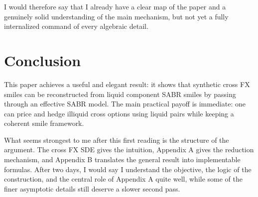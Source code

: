 \documentclass[11pt]{article}
\begin{document}
I would therefore say that I already have a clear map of the paper and a genuinely solid understanding of the main mechanism, but not yet a fully internalized command of every algebraic detail.

\section{Conclusion}

This paper achieves a useful and elegant result: it shows that synthetic cross FX smiles can be reconstructed from liquid component SABR smiles by passing through an effective SABR model. The main practical payoff is immediate: one can price and hedge illiquid cross options using liquid pairs while keeping a coherent smile framework.

What seems strongest to me after this first reading is the structure of the argument. The cross FX SDE gives the intuition, Appendix A gives the reduction mechanism, and Appendix B translates the general result into implementable formulas. After two days, I would say I understand the objective, the logic of the construction, and the central role of Appendix A quite well, while some of the finer asymptotic details still deserve a slower second pass.
\end{document}
